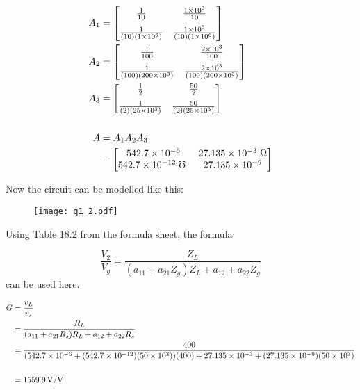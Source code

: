 \begin{enumerate}
{	\begin{align*}
	A_1 &= 
	\left[ \begin{matrix}
	\frac{1}{\Aone} 			& \frac{\Roone}{\Aone} \\[6pt] 
	\frac{1}{(\Aone) (\Rione) }	& \frac{\Roone}{(\Aone) (\Rione)}
	\end{matrix}  \right] 
	\\
	A_2 &= 
	\left[ \begin{matrix}
	\frac{1}{\Atwo} 			& \frac{\Rotwo}{\Atwo} \\[6pt] 
	\frac{1}{(\Atwo) (\Ritwo) }	& \frac{\Rotwo}{(\Atwo) (\Ritwo)}
	\end{matrix}  \right] 
	\\
	A_3 &= 
	\left[ \begin{matrix}
	\frac{1}{\Athree} 				& \frac{\Rothree}{\Athree} \\[6pt] 
	\frac{1}{(\Athree) (\Rithree) }	& \frac{\Rothree}{(\Athree) (\Rithree)}
	\end{matrix}  \right] 
	\\
	\\
	A &= A_1 A_2 A_3
	\\
	&= \left[ \begin{matrix}
	\Aoneone 			& \Aonetwo \; \Omega \\ 
	\Atwoone \; \mho \	& \Atwotwo
	\end{matrix}  \right]
	\end{align*}
	
	Now the circuit can be modelled like this:
	
	\begin{figure}[H]
	\begin{center}
	\texttt{[image: q1\_2.pdf]}
	\end{center}
	\end{figure}
	
	Using Table 18.2 from the formula sheet, the formula
	
	$$ \frac{V_2}{V_g} = \frac{Z_L}{(a_{11} + a_{21}Z_g)Z_L + a_{12} + a_{22}Z_g} $$
	can be used here.
	
	\begin{align*}
	G &= \frac{v_L}{v_s}
	\\
	&= \frac{R_L}{(a_{11} + a_{21}R_s)R_L + a_{12} + a_{22}R_s}
	\\
	&= \frac{400}{(542.7 \times 10^{-6} + (542.7 \times 10^{-12})(50 \times 10^3))(400) + 27.135 \times 10^{-3} + (27.135 \times 10^{-9})(50 \times 10^3)}
	\\ \\
	&= 1559.9 \, \text{V/V}
	\\
	\end{align*}
	
	}
\end{enumerate}